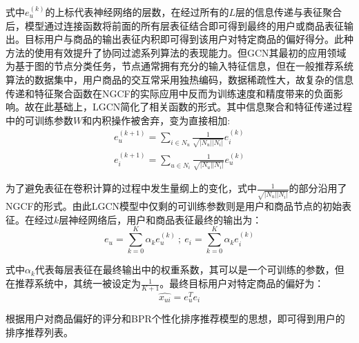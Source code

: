 \documentclass[lang=cn,11pt,a4paper,cite=authoryear]{elegantpaper}
\begin{document}
式中$e_u^{(k)}$的上标代表神经网络的层数，在经过所有的$L$层的信息传递与表征聚合后，模型通过连接函数将前面的所有层表征结合即可得到最终的用户或商品表征输出。目标用户与商品的输出表征内积即可得到该用户对特定商品的偏好得分。此种方法的使用有效提升了协同过滤系列算法的表现能力。但GCN其最初的应用领域为基于图的节点分类任务，节点通常拥有充分的输入特征信息，但在一般推荐系统算法的数据集中，用户商品的交互常采用独热编码，数据稀疏性大，故复杂的信息传递和特征聚合函数在NGCF的实际应用中反而为训练速度和精度带来的负面影响。故在此基础上，LGCN简化了相关函数的形式。其中信息聚合和特征传递过程中的可训练参数$W$和内积操作被舍弃，变为直接相加:
\begin{gather}
  e_u^{(k+1)} = \sum_{i\in N_u}\frac{1}{\sqrt{|N_u||N_i|}}e_i^{(k)} \\
  e_i^{(k+1)} = \sum_{u\in N_i}\frac{1}{\sqrt{|N_u||N_i|}}e_u^{(k)}
\end{gather}

为了避免表征在卷积计算的过程中发生量纲上的变化，式中$\frac{1}{\sqrt{|N_u||N_i|}}$的部分沿用了NGCF的形式。由此LGCN模型中仅剩的可训练参数则是用户和商品节点的初始表征。在经过$k$层神经网络后，用户和商品表征最终的输出为：
\begin{equation}
  e_u = \sum_{k=0}^K\alpha_ke_u^{(k)} \ ; \ e_i = \sum_{k=0}^K\alpha_ke_i^{(k)}
\end{equation}

式中$\alpha_k$代表每层表征在最终输出中的权重系数，其可以是一个可训练的参数，但在推荐系统中，其统一被设定为$\frac{1}{K+1}$。最终目标用户对特定商品的偏好为：
\begin{equation}
  \hat{x_{ui}} = e_u^Te_i
\end{equation}

根据用户对商品偏好的评分和BPR个性化排序推荐模型的思想，即可得到用户的排序推荐列表。
\end{document}
